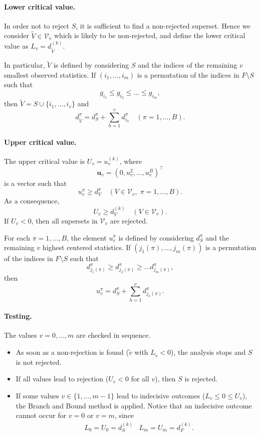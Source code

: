 \documentclass[11pt,a4paper,openright,twoside]{article}
\begin{document}
\paragraph{Lower critical value.} In order not to reject $S$, it is sufficient to find a non-rejected superset. Hence we consider $\tilde{V}\in\mathcal{V}_v$ which is likely to be non-rejected, and define the lower critical value as $L_v=d_{\tilde{V}}^{(k)}$.

In particular, $\tilde{V}$ is defined by considering $S$ and the indices of the remaining $v$ smallest observed statistics. If $(i_1,\ldots,i_m)$ is a permutation of the indices in $F\setminus S$ such that
\[g_{i_1}\leq g_{i_2}\leq\ldots\leq g_{i_m},\]
then $\tilde{V}=S\cup \{i_1,\ldots,i_v\}$ and
\[d_{\tilde{V}}^\pi = d_S^\pi + \sum_{h=1}^v d_{i_h}^\pi\quad (\pi=1,\ldots,B).\]

\paragraph{Upper critical value.} The upper critical value is $U_v=u_v^{(k)}$, where
\[\mathbf{u}_v=(0,u_v^2,\ldots,u_v^B)^\top\]
is a vector such that
\[u_v^\pi\geq d_V^\pi\quad (V\in\mathcal{V}_v,\;\pi=1,\ldots,B).\]
As a consequence,
\[U_v \geq d_V^{(k)}\quad (V\in\mathcal{V}_v).\]
If $U_v<0$, then all supersets in $\mathcal{V}_v$ are rejected.

For each $\pi=1,\ldots,B$, the element $u_v^\pi$ is defined by considering $d_S^\pi$ and the remaining $v$ highest centered statistics. If $(j_1(\pi),\ldots,j_m(\pi))$ is a permutation of the indices in $F\setminus S$ such that
\[d_{j_1(\pi)}^\pi\geq d_{j_2(\pi)}^\pi\geq\ldots d_{j_m(\pi)}^\pi ,\]
then
\[u_v^\pi=d_S^\pi + \sum_{h=1}^v d_{j_h(\pi)}^\pi.\]




\paragraph{Testing.}
The values $v=0,\ldots, m$ are checked in sequence.
\begin{itemize}
\item As soon as a non-rejection is found ($\tilde{v}$ with $L_{\tilde{v}}< 0$), the analysis stops and $S$ is not rejected.
\item If all values lead to rejection ($U_v<0$ for all $v$), then $S$ is rejected.
\item If some values $v\in \{1,\ldots,m-1\}$ lead to indecisive outcomes ($L_v\leq 0\leq U_v$), the Branch and Bound method is applied. Notice that an indecisive outcome cannot occur for $v=0$ or $v=m$, since
\begin{align*}
& L_0=U_0=d_S^{(k)} & L_m=U_m=d_F^{(k)}.
\end{align*}
\end{itemize}
\end{document}
